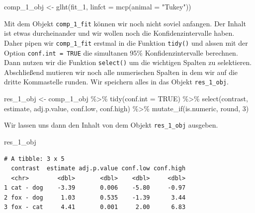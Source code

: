\documentclass[
  letterpaper,
]{scrbook}
\newenvironment{Shaded}{\begin{snugshade}}{\end{snugshade}}
\newcommand{\AttributeTok}[1]{\textcolor[rgb]{0.40,0.45,0.13}{#1}}
\newcommand{\ConstantTok}[1]{\textcolor[rgb]{0.56,0.35,0.01}{#1}}
\newcommand{\DecValTok}[1]{\textcolor[rgb]{0.68,0.00,0.00}{#1}}
\newcommand{\FunctionTok}[1]{\textcolor[rgb]{0.28,0.35,0.67}{#1}}
\newcommand{\NormalTok}[1]{\textcolor[rgb]{0.00,0.23,0.31}{#1}}
\newcommand{\OtherTok}[1]{\textcolor[rgb]{0.00,0.23,0.31}{#1}}
\newcommand{\SpecialCharTok}[1]{\textcolor[rgb]{0.37,0.37,0.37}{#1}}
\newcommand{\StringTok}[1]{\textcolor[rgb]{0.13,0.47,0.30}{#1}}
\begin{document}
\begin{Shaded}
\begin{Highlighting}[]
\NormalTok{comp\_1\_obj }\OtherTok{\textless{}{-}} \FunctionTok{glht}\NormalTok{(fit\_1, }\AttributeTok{linfct =} \FunctionTok{mcp}\NormalTok{(}\AttributeTok{animal =} \StringTok{"Tukey"}\NormalTok{)) }
\end{Highlighting}
\end{Shaded}

Mit dem Objekt \texttt{comp\_1\_fit} können wir noch nicht soviel
anfangen. Der Inhalt ist etwas durcheinander und wir wollen noch die
Konfidenzintervalle haben. Daher pipen wir \texttt{comp\_1\_fit} erstmal
in die Funktion \texttt{tidy()} und alssen mit der Option
\texttt{conf.int\ =\ TRUE} die simultanen 95\% Konfidenzintervalle
berechnen. Dann nutzen wir die Funktion \texttt{select()} um die
wichtigen Spalten zu selektieren. Abschließend mutieren wir noch alle
numerischen Spalten in dem wir auf die dritte Kommastelle runden. Wir
speichern alles in das Objekt \texttt{res\_1\_obj}.

\begin{Shaded}
\begin{Highlighting}[]
\NormalTok{res\_1\_obj }\OtherTok{\textless{}{-}}\NormalTok{ comp\_1\_obj }\SpecialCharTok{\%\textgreater{}\%} 
  \FunctionTok{tidy}\NormalTok{(}\AttributeTok{conf.int =} \ConstantTok{TRUE}\NormalTok{) }\SpecialCharTok{\%\textgreater{}\%} 
  \FunctionTok{select}\NormalTok{(contrast, estimate, adj.p.value, }
\NormalTok{         conf.low, conf.high) }\SpecialCharTok{\%\textgreater{}\%} 
  \FunctionTok{mutate\_if}\NormalTok{(is.numeric, round, }\DecValTok{3}\NormalTok{)}
\end{Highlighting}
\end{Shaded}

Wir lassen uns dann den Inhalt von dem Objekt \texttt{res\_1\_obj}
ausgeben.

\begin{Shaded}
\begin{Highlighting}[]
\NormalTok{res\_1\_obj}
\end{Highlighting}
\end{Shaded}

\begin{verbatim}
# A tibble: 3 x 5
  contrast  estimate adj.p.value conf.low conf.high
  <chr>        <dbl>       <dbl>    <dbl>     <dbl>
1 cat - dog    -3.39       0.006    -5.80     -0.97
2 fox - dog     1.03       0.535    -1.39      3.44
3 fox - cat     4.41       0.001     2.00      6.83
\end{verbatim}
\end{document}
